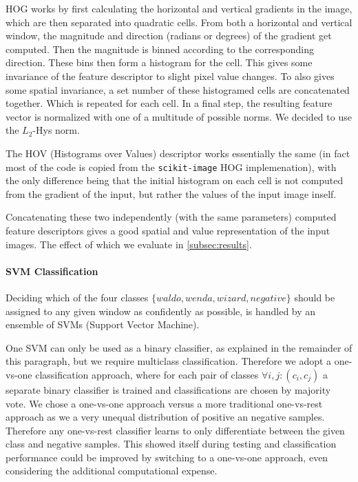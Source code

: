 \documentclass[11pt]{article}
\begin{document}
HOG works by first calculating the horizontal and vertical gradients in the image, which are then separated into
quadratic cells. From both a horizontal and vertical window, the magnitude and direction (radians or degrees) of the gradient get computed.
Then the magnitude is binned according to the corresponding direction. These bins then form a histogram for the cell.
This gives some invariance of the feature descriptor to slight pixel value changes. 
To also gives some spatial invariance, a set number of these histogramed cells are concatenated together. Which is repeated for each cell.
In a final step, the resulting feature vector is normalized with one of a multitude of possible norms. We decided to use the \( L_2 \)-Hys norm.

The HOV (Histograms over Values) descriptor works essentially the same (in fact most of the code is copied from the \verb|scikit-image| HOG implemenation),
with the only difference being that the initial histogram on each cell is not computed from the gradient of the input,
but rather the values of the input image inself.

Concatenating these two independently (with the same parameters) computed feature descriptors gives a good spatial and
value representation of the input images. The effect of which we evaluate in \autoref{subsec:results}.


\paragraph{SVM Classification}
Deciding which of the four classes \( \{waldo, wenda, wizard, negative \} \) should be assigned to any given window 
as confidently as possible, is handled by an ensemble of SVMs (Support Vector Machine)\cite{Hearst:1998:SVM:630302.630387}.

One SVM can only be used as a binary classifier, as explained in the remainder of this paragraph, but we require multiclass classification. 
Therefore we adopt a one-vs-one classification approach, where for each pair of classes \( \forall i,j: (c_i,c_j) \) a separate binary classifier is trained
and classifications are chosen by majority vote. We chose a one-vs-one approach versus a more traditional one-vs-rest approach as we a very unequal distribution of
positive an negative samples. Therefore any one-vs-rest classifier learns to only differentiate between the given class and negative samples. This showed itself 
during testing and classification performance could be improved by switching to a one-vs-one approach, even considering the additional computational expense.
\end{document}
